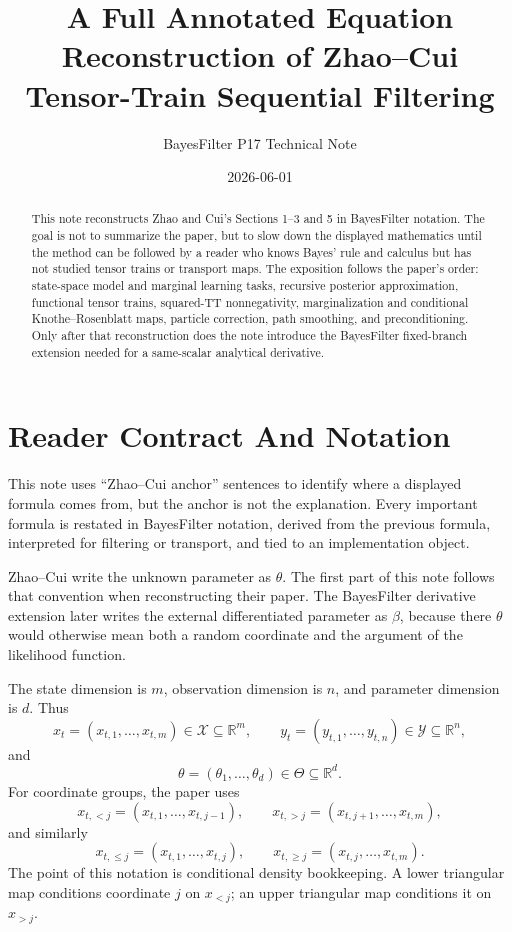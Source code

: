 \documentclass[11pt]{article}
\title{A Full Annotated Equation Reconstruction of Zhao--Cui Tensor-Train Sequential Filtering}
\author{BayesFilter P17 Technical Note}
\date{2026-06-01}
\newcommand{\R}{\mathbb R}
\begin{document}
\maketitle

\begin{abstract}
This note reconstructs Zhao and Cui's Sections 1--3 and 5 in BayesFilter
notation.  The goal is not to summarize the paper, but to slow down the
displayed mathematics until the method can be followed by a reader who knows
Bayes' rule and calculus but has not studied tensor trains or transport maps.
The exposition follows the paper's order: state-space model and marginal
learning tasks, recursive posterior approximation, functional tensor trains,
squared-TT nonnegativity, marginalization and conditional
Knothe--Rosenblatt maps, particle correction, path smoothing, and
preconditioning.  Only after that reconstruction does the note introduce the
BayesFilter fixed-branch extension needed for a same-scalar analytical
derivative.
\end{abstract}

\tableofcontents

\section{Reader Contract And Notation}

This note uses ``Zhao--Cui anchor'' sentences to identify where a displayed
formula comes from, but the anchor is not the explanation.  Every important
formula is restated in BayesFilter notation, derived from the previous
formula, interpreted for filtering or transport, and tied to an implementation
object.

Zhao--Cui write the unknown parameter as \(\theta\).  The first part of this
note follows that convention when reconstructing their paper.  The
BayesFilter derivative extension later writes the external differentiated
parameter as \(\beta\), because there \(\theta\) would otherwise mean both a
random coordinate and the argument of the likelihood function.

The state dimension is \(m\), observation dimension is \(n\), and parameter
dimension is \(d\).  Thus
\[
    x_t=(x_{t,1},\ldots,x_{t,m})\in\mathcal X\subseteq\R^m,
    \qquad
    y_t=(y_{t,1},\ldots,y_{t,n})\in\mathcal Y\subseteq\R^n,
\]
and
\[
    \theta=(\theta_1,\ldots,\theta_d)\in\Theta\subseteq\R^d.
\]
For coordinate groups, the paper uses
\[
    x_{t,<j}=(x_{t,1},\ldots,x_{t,j-1}),\qquad
    x_{t,>j}=(x_{t,j+1},\ldots,x_{t,m}),
    \tag{N1}
\]
and similarly
\[
    x_{t,\le j}=(x_{t,1},\ldots,x_{t,j}),\qquad
    x_{t,\ge j}=(x_{t,j},\ldots,x_{t,m}).
    \tag{N2}
\]
The point of this notation is conditional density bookkeeping.  A lower
triangular map conditions coordinate \(j\) on \(x_{<j}\); an upper triangular
map conditions it on \(x_{>j}\).
\end{document}
